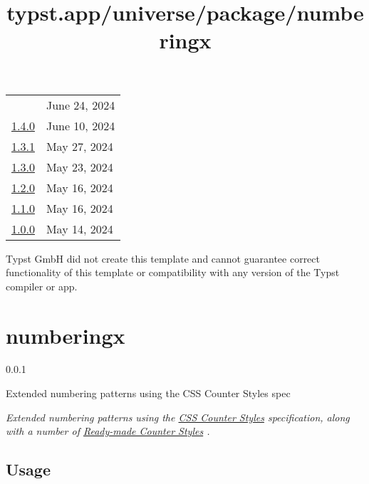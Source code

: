 \begin{longtable}[]{@{}ll@{}}
& June 24, 2024 \\
\href{https://typst.app/universe/package/supercharged-dhbw/1.4.0/}{1.4.0}
& June 10, 2024 \\
\href{https://typst.app/universe/package/supercharged-dhbw/1.3.1/}{1.3.1}
& May 27, 2024 \\
\href{https://typst.app/universe/package/supercharged-dhbw/1.3.0/}{1.3.0}
& May 23, 2024 \\
\href{https://typst.app/universe/package/supercharged-dhbw/1.2.0/}{1.2.0}
& May 16, 2024 \\
\href{https://typst.app/universe/package/supercharged-dhbw/1.1.0/}{1.1.0}
& May 16, 2024 \\
\href{https://typst.app/universe/package/supercharged-dhbw/1.0.0/}{1.0.0}
& May 14, 2024 \\
\end{longtable}

Typst GmbH did not create this template and cannot guarantee correct
functionality of this template or compatibility with any version of the
Typst compiler or app.


\title{typst.app/universe/package/numberingx}

\label{banner}
\section{numberingx}\label{numberingx}

{ 0.0.1 }

Extended numbering patterns using the CSS Counter Styles spec

\label{readme}
\emph{Extended numbering patterns using the
\href{https://www.w3.org/TR/css-counter-styles-3/}{CSS Counter Styles}
specification, along with a number of
\href{https://www.w3.org/TR/predefined-counter-styles/}{Ready-made
Counter Styles} .}

\subsection{Usage}\label{usage}

\begin{Shaded}
\begin{Highlighting}[]
\NormalTok{\#} 

\OperatorTok{:}\NormalTok{(}
\NormalTok{))}
\end{Highlighting}
\end{Shaded}

